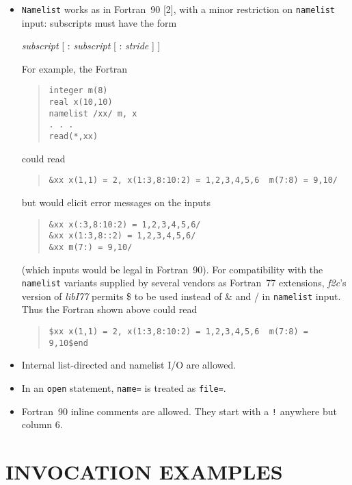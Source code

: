 \documentclass[12pt]{article}
\begin{document}
\begin{itemize}
\item \verb|Namelist| works as in Fortran~90 [2], with a minor restriction on \verb|namelist| input: subscripts must
have the form
\begin{center}
\emph{subscript} [ : \emph{subscript} [ : \emph{stride} ] ]
\end{center}
For example, the Fortran
\begin{quote}
\begin{verbatim}
integer m(8)
real x(10,10)
namelist /xx/ m, x
. . .
read(*,xx)
\end{verbatim}
\end{quote}
could read
\begin{quote}
\begin{verbatim}
&xx x(1,1) = 2, x(1:3,8:10:2) = 1,2,3,4,5,6  m(7:8) = 9,10/
\end{verbatim}
\end{quote}
but would elicit error messages on the inputs
\begin{quote}
\begin{verbatim}
&xx x(:3,8:10:2) = 1,2,3,4,5,6/
&xx x(1:3,8::2) = 1,2,3,4,5,6/
&xx m(7:) = 9,10/
\end{verbatim}
\end{quote}
(which inputs would be legal in Fortran~90). For compatibility with the \verb|namelist| variants supplied by several vendors as Fortran~77 extensions, \emph{f2c}’s version of \emph{libI77} permits \$ to be used instead of \& and / in \verb|namelist| input. Thus the Fortran shown above could read
\begin{quote}
\begin{verbatim}
$xx x(1,1) = 2, x(1:3,8:10:2) = 1,2,3,4,5,6  m(7:8) = 9,10$end
\end{verbatim}
\end{quote}

\item Internal list-directed and namelist I/O are allowed.

\item In an \verb|open| statement, \verb|name=| is treated as \verb|file=|.

\item Fortran~90 inline comments are allowed. They start with a \verb|!| anywhere but column 6.
\end{itemize}

\section{INVOCATION EXAMPLES}
\end{document}
